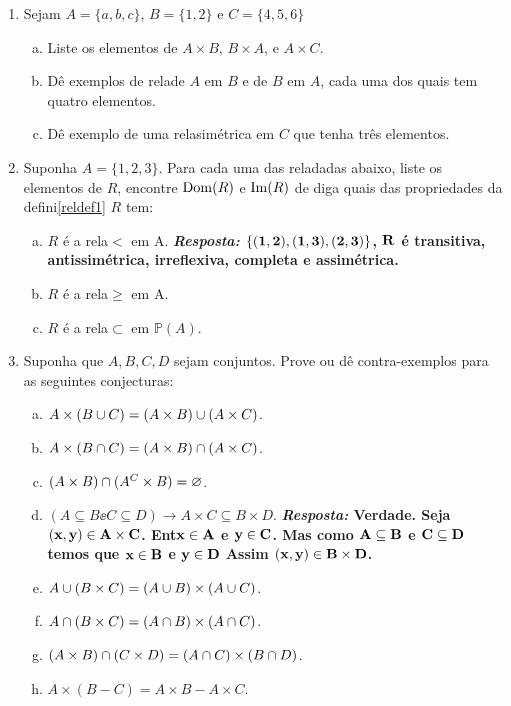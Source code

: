 \begin{enumerate}[{\bf 1.}]
\item Sejam $A=\{a,b,c\}$, $B=\{1,2\}$ e $C=\{4,5,6\}$
\begin{enumerate}[a)]
\item Liste os elementos de $A\times B$, $B\times A$, e $A\times C$.
\item D\^e exemplos de rela\coes de $A$ em $B$ e de $B$ em $A$, cada uma dos quais tem quatro elementos.
\item D\^e exemplo de uma rela\cao sim\'etrica em $C$ que tenha tr\^es elementos.
\end{enumerate}

\item Suponha $A=\{1,2,3\}$. Para cada uma das rela\coes dadas abaixo, liste os elementos de $R$, encontre $\operatorname{Dom}(R)$ e $\operatorname{Im}(R)$ de diga quais das propriedades da defini\cao \ref{reldef1} $R$ tem:
\begin{enumerate}[a)]
\item $R$ \'e a rela\cao $<$ em A. {\bf{\it Resposta:} ${\bf \{(1,2),(1,3),(2,3)\}}$, ${\bf R}$ \'e transitiva, antissim\'etrica, irreflexiva, completa e assim\'etrica.}
\item $R$ \'e a rela\cao $\geq$ em A.
\item $R$ \'e a rela\cao $\subset$ em $\mathbb{P}(A)$.
\end{enumerate}

\item Suponha que $A,B,C,D$ sejam conjuntos. Prove ou d\^e contra-exemplos para as seguintes conjecturas:
\begin{enumerate}[a)]
\item $A\times(B\cup C)= (A\times B)\cup(A\times C)$.
\item $A\times(B\cap C)=(A\times B)\cap(A\times C)$.
\item $(A\times B)\cap(A^C\times B)=\varnothing$.
\item $(A\subseteq B\ee C\subseteq D)\to A\times C\subseteq B\times D$. {\bf{\it Resposta:} Verdade. Seja ${\bf (x,y)\in A\times C}$. Ent\ao ${\bf x\in A}$ e ${\bf y\in C}$. Mas como ${\bf A\subseteq B}$ e ${\bf C\subseteq D}$ temos que ${\bf x\in B}$ e ${\bf y\in D}$ Assim ${\bf (x,y)\in B\times D}$.}
\item $A\cup(B\times C)=(A\cup B)\times(A\cup C)$.
\item $A\cap(B\times C)=(A\cap B)\times(A\cap C)$.
\item $(A\times B)\cap(C\times D)=(A\cap C)\times(B\cap D)$.
\item $A\times(B-C)=A\times B-A\times C$.
\end{enumerate}


\end{enumerate}

